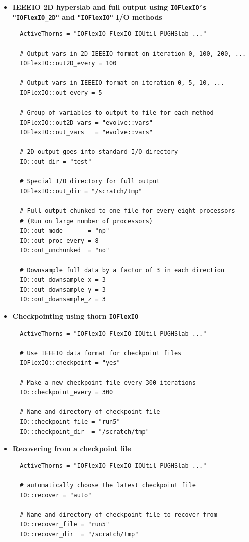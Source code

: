 \documentclass{article}
\begin{document}
\begin{itemize}
\item{\bf IEEEIO 2D hyperslab and full output using {\tt IOFlexIO's "IOFlexIO\_2D"} and {\tt "IOFlexIO"} I/O methods}
\begin{verbatim}
  ActiveThorns = "IOFlexIO FlexIO IOUtil PUGHSlab ..."

  # Output vars in 2D IEEEIO format on iteration 0, 100, 200, ...
  IOFlexIO::out2D_every = 100

  # Output vars in IEEEIO format on iteration 0, 5, 10, ...
  IOFlexIO::out_every = 5

  # Group of variables to output to file for each method
  IOFlexIO::out2D_vars = "evolve::vars"
  IOFlexIO::out_vars   = "evolve::vars"

  # 2D output goes into standard I/O directory
  IO::out_dir = "test"

  # Special I/O directory for full output
  IOFlexIO::out_dir = "/scratch/tmp"

  # Full output chunked to one file for every eight processors
  # (Run on large number of processors)
  IO::out_mode       = "np"
  IO::out_proc_every = 8
  IO::out_unchunked  = "no"

  # Downsample full data by a factor of 3 in each direction
  IO::out_downsample_x = 3
  IO::out_downsample_y = 3
  IO::out_downsample_z = 3
\end{verbatim}

\item{\bf Checkpointing using thorn {\tt IOFlexIO}}
\begin{verbatim}
  ActiveThorns = "IOFlexIO FlexIO IOUtil PUGHSlab ..."

  # Use IEEEIO data format for checkpoint files
  IOFlexIO::checkpoint = "yes"

  # Make a new checkpoint file every 300 iterations
  IO::checkpoint_every = 300

  # Name and directory of checkpoint file
  IO::checkpoint_file = "run5"
  IO::checkpoint_dir  = "/scratch/tmp"
\end{verbatim}

\item{\bf Recovering from a checkpoint file}
\begin{verbatim}
  ActiveThorns = "IOFlexIO FlexIO IOUtil PUGHSlab ..."

  # automatically choose the latest checkpoint file
  IO::recover = "auto"

  # Name and directory of checkpoint file to recover from
  IO::recover_file = "run5"
  IO::recover_dir  = "/scratch/tmp"
\end{verbatim}

\end{itemize}
\end{document}
